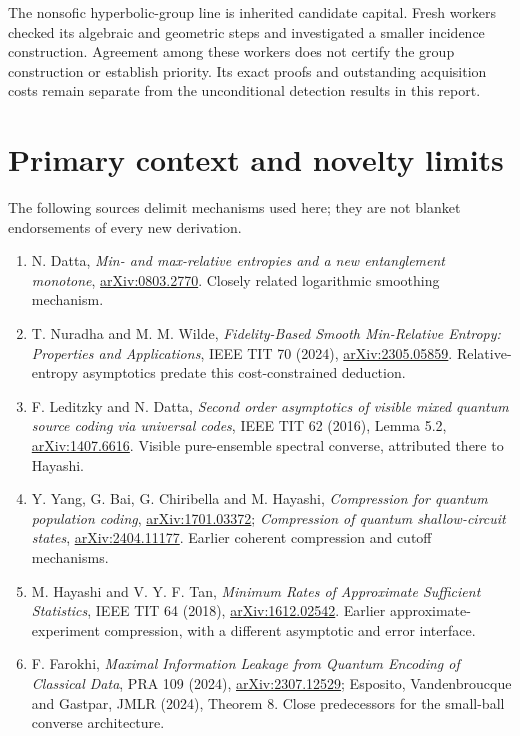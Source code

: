 \documentclass[11pt]{article}
\begin{document}
The nonsofic hyperbolic-group line is inherited candidate capital. Fresh workers checked its algebraic and geometric steps and investigated a smaller incidence construction. Agreement among these workers does not certify the group construction or establish priority. Its exact proofs and outstanding acquisition costs remain separate from the unconditional detection results in this report.

\section{Primary context and novelty limits}\label{sec:refs}
The following sources delimit mechanisms used here; they are not blanket endorsements of every new derivation.
\begin{enumerate}
\item N. Datta, \emph{Min- and max-relative entropies and a new entanglement monotone}, \href{https://arxiv.org/abs/0803.2770}{arXiv:0803.2770}. Closely related logarithmic smoothing mechanism.
\item T. Nuradha and M. M. Wilde, \emph{Fidelity-Based Smooth Min-Relative Entropy: Properties and Applications}, IEEE TIT 70 (2024), \href{https://arxiv.org/abs/2305.05859}{arXiv:2305.05859}. Relative-entropy asymptotics predate this cost-constrained deduction.
\item F. Leditzky and N. Datta, \emph{Second order asymptotics of visible mixed quantum source coding via universal codes}, IEEE TIT 62 (2016), Lemma 5.2, \href{https://arxiv.org/abs/1407.6616}{arXiv:1407.6616}. Visible pure-ensemble spectral converse, attributed there to Hayashi.
\item Y. Yang, G. Bai, G. Chiribella and M. Hayashi, \emph{Compression for quantum population coding}, \href{https://arxiv.org/abs/1701.03372}{arXiv:1701.03372}; \emph{Compression of quantum shallow-circuit states}, \href{https://arxiv.org/abs/2404.11177}{arXiv:2404.11177}. Earlier coherent compression and cutoff mechanisms.
\item M. Hayashi and V. Y. F. Tan, \emph{Minimum Rates of Approximate Sufficient Statistics}, IEEE TIT 64 (2018), \href{https://arxiv.org/abs/1612.02542}{arXiv:1612.02542}. Earlier approximate-experiment compression, with a different asymptotic and error interface.
\item F. Farokhi, \emph{Maximal Information Leakage from Quantum Encoding of Classical Data}, PRA 109 (2024), \href{https://arxiv.org/abs/2307.12529}{arXiv:2307.12529}; Esposito, Vandenbroucque and Gastpar, JMLR (2024), Theorem 8. Close predecessors for the small-ball converse architecture.

\end{enumerate}
\end{document}
